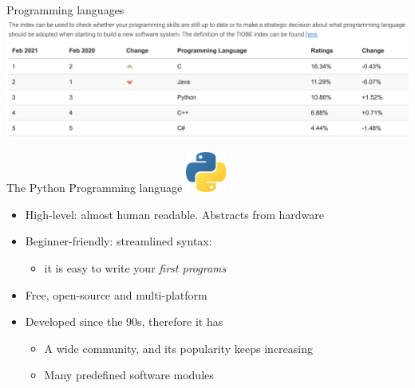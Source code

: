 \documentclass{beamer}%
\begin{document}
\begin{frame}{Programming languages}
	\centering
	\includegraphics[width=1.0\textwidth]{figures/tiobe02_2021}
	{\scriptsize{}}
\end{frame}


\begin{frame}{The Python Programming language}
\centering
\includegraphics[width=0.1\textwidth]{figures/python-logo}

\begin{itemize}
\item High-level: almost human readable. Abstracts from hardware
\item Beginner-friendly: streamlined syntax: 
\begin{itemize}
	\item it is easy to write your \emph{first programs}
\end{itemize}	
\item Free, open-source and multi-platform
\item Developed since the 90s, therefore it has 
\begin{itemize}
\item A wide community, and its popularity keeps increasing
\item Many predefined software modules
\end{itemize}
\end{itemize}
\end{frame}
\end{document}
